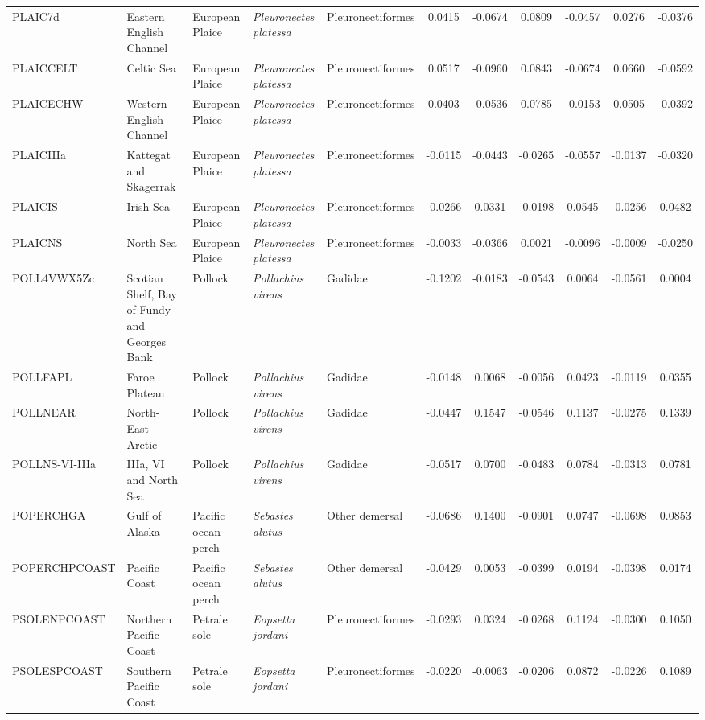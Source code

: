\begin{longtable}{p{3cm}p{3cm}lllcccccc}
  PLAIC7d & Eastern English Channel & European Plaice & \textit{Pleuronectes platessa} & Pleuronectiformes & 0.0415 & -0.0674 & 0.0809 & -0.0457 & 0.0276 & -0.0376 \\
  PLAICCELT & Celtic Sea & European Plaice & \textit{Pleuronectes platessa} & Pleuronectiformes & 0.0517 & -0.0960 & 0.0843 & -0.0674 & 0.0660 & -0.0592 \\
  PLAICECHW & Western English Channel & European Plaice & \textit{Pleuronectes platessa} & Pleuronectiformes & 0.0403 & -0.0536 & 0.0785 & -0.0153 & 0.0505 & -0.0392 \\
  PLAICIIIa & Kattegat and Skagerrak & European Plaice & \textit{Pleuronectes platessa} & Pleuronectiformes & -0.0115 & -0.0443 & -0.0265 & -0.0557 & -0.0137 & -0.0320 \\
  PLAICIS & Irish Sea & European Plaice & \textit{Pleuronectes platessa} & Pleuronectiformes & -0.0266 & 0.0331 & -0.0198 & 0.0545 & -0.0256 & 0.0482 \\
  PLAICNS & North Sea & European Plaice & \textit{Pleuronectes platessa} & Pleuronectiformes & -0.0033 & -0.0366 & 0.0021 & -0.0096 & -0.0009 & -0.0250 \\
  POLL4VWX5Zc & Scotian Shelf, Bay of Fundy and Georges Bank & Pollock & \textit{Pollachius virens} & Gadidae & -0.1202 & -0.0183 & -0.0543 & 0.0064 & -0.0561 & 0.0004 \\
  POLLFAPL & Faroe Plateau & Pollock & \textit{Pollachius virens} & Gadidae & -0.0148 & 0.0068 & -0.0056 & 0.0423 & -0.0119 & 0.0355 \\
  POLLNEAR & North-East Arctic & Pollock & \textit{Pollachius virens} & Gadidae & -0.0447 & 0.1547 & -0.0546 & 0.1137 & -0.0275 & 0.1339 \\
  POLLNS-VI-IIIa & IIIa, VI and North Sea & Pollock & \textit{Pollachius virens} & Gadidae & -0.0517 & 0.0700 & -0.0483 & 0.0784 & -0.0313 & 0.0781 \\
  POPERCHGA & Gulf of Alaska & Pacific ocean perch & \textit{Sebastes alutus} & Other demersal & -0.0686 & 0.1400 & -0.0901 & 0.0747 & -0.0698 & 0.0853 \\
  POPERCHPCOAST & Pacific Coast & Pacific ocean perch & \textit{Sebastes alutus} & Other demersal & -0.0429 & 0.0053 & -0.0399 & 0.0194 & -0.0398 & 0.0174 \\
  PSOLENPCOAST & Northern Pacific Coast & Petrale sole & \textit{Eopsetta jordani} & Pleuronectiformes & -0.0293 & 0.0324 & -0.0268 & 0.1124 & -0.0300 & 0.1050 \\
  PSOLESPCOAST & Southern Pacific Coast & Petrale sole & \textit{Eopsetta jordani} & Pleuronectiformes & -0.0220 & -0.0063 & -0.0206 & 0.0872 & -0.0226 & 0.1089 \\

\end{longtable}
